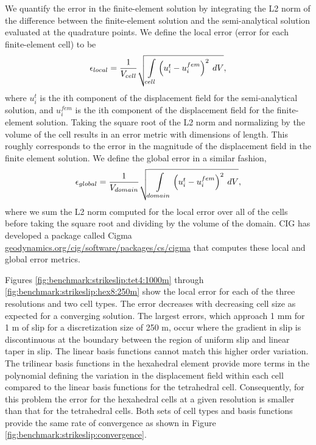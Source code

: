 We quantify the error in the finite-element solution by integrating
the L2 norm of the difference between the finite-element solution
 and the semi-analytical solution evaluated at the quadrature points.
We define the local error (error for each finite-element cell) to
be
\begin{equation}
\epsilon_{local}=\frac{1}{V_{cell}}\sqrt{\intop_{cell}\left(u_{i}^{t}-u_{i}^{fem}\right)^{2}\: dV},
\end{equation}
where $u_{i}^{t}$ is the ith component of the displacement field
for the semi-analytical  solution, and $u_{i}^{fem}$ is the ith component
of the displacement field for the finite-element  solution.  Taking
the square root of the L2 norm and normalizing by  the volume of the
cell results in an error metric with dimensions of length.  This roughly
corresponds to the error in the magnitude of the displacement field
in the finite element solution. We define the global error in a similar
fashion,
\begin{equation}
\epsilon_{global}=\frac{1}{V_{domain}}\sqrt{\intop_{domain}\left(u_{i}^{t}-u_{i}^{fem}\right)^{2}\: dV},
\end{equation}
 where we sum the L2 norm computed for the local error over all of
the  cells before taking the square root and dividing by the volume
of the domain. CIG has developed a package called Cigma \url{geodynamics.org/cig/software/packages/cs/cigma}
that computes these local and global error metrics.

Figures \vref{fig:benchmark:strikeslip:tet4:1000m} through \vref{fig:benchmark:strikeslip:hex8:250m}
show the local error for each of the three resolutions and two cell
types. The error decreases with decreasing cell size as expected for
a converging solution. The largest errors, which approach 1 mm for
1 m of slip for a discretization size of 250 m, occur where the gradient
in slip is discontinuous at the boundary between the region of uniform
slip and linear taper in slip. The linear basis functions cannot match
this higher order variation. The trilinear basis functions in the
hexahedral element provide more terms in the polynomial defining the
variation in the displacement field within each cell compared to the
linear basis functions for the tetrahedral cell. Consequently, for
this problem the error for the hexahedral cells at a given resolution
is smaller than that for the tetrahedral cells. Both sets of cell
types and basis functions provide the same rate of convergence as
shown in Figure \vref{fig:benchmark:strikeslip:convergence}.

